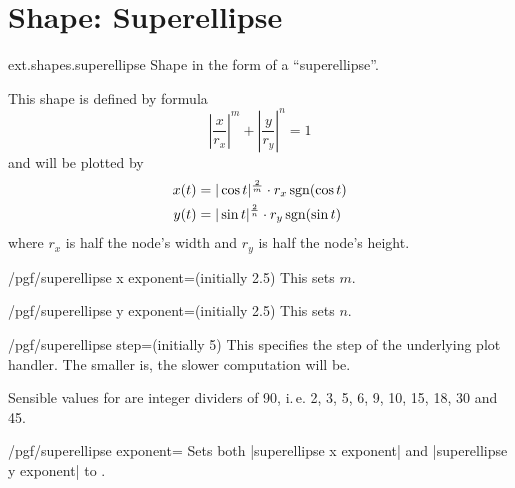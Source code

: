 %
%
%

\section{Shape: Superellipse}
\begin{pgflibrary}{ext.shapes.superellipse}
  Shape in the form of a ``superellipse''.
\end{pgflibrary}

This shape is defined by formula
\begin{equation*}
  \left|\frac x{r_x}\right|^m + \left|\frac y{r_y}\right|^n = 1
\end{equation*}
and will be plotted by
\begin{align*}
  x(t) &= |\cos t|^{\frac 2m} \cdot r_x \operatorname{sgn}(\cos t) \\
  y(t) &= |\sin t|^{\frac 2n} \cdot r_y \operatorname{sgn}(\sin t) \\
\end{align*}
where $r_x$ is half the node's width and $r_y$ is half the node's height.

\begin{key}{/pgf/superellipse x exponent=(initially 2.5)}
This sets $m$.
\end{key}
\begin{key}{/pgf/superellipse y exponent=(initially 2.5)}
This sets $n$.
\end{key}
\begin{key}{/pgf/superellipse step=(initially 5)}
This specifies the step of the underlying plot handler.
The smaller  is, the slower computation will be.

Sensible values for  are integer dividers of 90, i.\,e.
2, 3, 5, 6, 9, 10, 15, 18, 30 and 45.
\end{key}
\begin{key}{/pgf/superellipse exponent=}
  Sets both |superellipse x exponent| and |superellipse y exponent| to .
\end{key}

